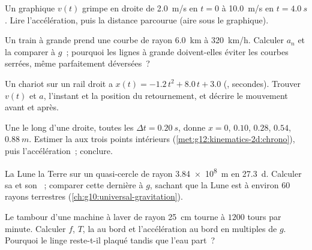 \begin{exercise}[$\star$]\label{exo:g12:kinematics-2d:5}
Un graphique $v(t)$ grimpe en droite de \qty{2.0}{m/s} en $t = 0$ à
\qty{10.0}{m/s} en $t = \qty{4.0}{s}$. Lire l'accélération, puis la
distance parcourue (aire sous le graphique).
\end{exercise}

\begin{exercise}[$\star\star$]\label{exo:g12:kinematics-2d:6}
Un train à grande  prend une courbe de rayon
\qty{6.0}{km} à \qty{320}{km/h}. Calculer $a_n$ et la comparer à $g$~;
pourquoi les lignes à grande  doivent-elles éviter les
courbes serrées, même parfaitement déversées~?
\end{exercise}

\begin{exercise}[$\star\star$]\label{exo:g12:kinematics-2d:7}
Un chariot sur un rail droit a $x(t) = -1.2\,t^2 + 8.0\,t + 3.0$
(, secondes). Trouver $v(t)$ et $a$, l'instant et la position du
retournement, et décrire le mouvement avant et après.
\end{exercise}

\begin{exercise}[$\star\star$]\label{exo:g12:kinematics-2d:8}
Une  le long d'une droite, toutes les
$\Delta t = \qty{0.20}{s}$, donne $x = 0$, $0.10$, $0.28$, $0.54$,
$\qty{0.88}{m}$. Estimer la  aux trois points intérieurs
(\cref{met:g12:kinematics-2d:chrono}), puis l'accélération~; conclure.
\end{exercise}

\begin{exercise}[$\star\star$]\label{exo:g12:kinematics-2d:9}
La Lune  la Terre sur un quasi-cercle de rayon
\qty{3.84e8}{m} en \qty{27.3}{d}. Calculer sa
 et son ~;
comparer cette dernière à $g$, sachant que la Lune est à environ
$60$ rayons terrestres (\cref{ch:g10:universal-gravitation}).
\end{exercise}

\begin{exercise}[$\star\star$]\label{exo:g12:kinematics-2d:10}
Le tambour d'une machine à laver de rayon \qty{25}{cm} tourne à $1200$
tours par minute. Calculer $f$, $T$, la  au bord et
l'accélération au bord en multiples de $g$. Pourquoi le linge reste-t-il
plaqué tandis que l'eau part~?
\end{exercise}

